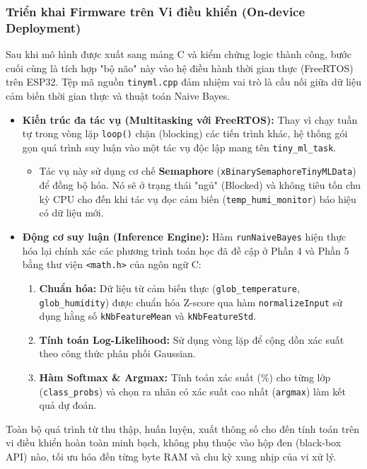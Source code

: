 \subsubsection{Triển khai Firmware trên Vi điều khiển (On-device Deployment)}

Sau khi mô hình được xuất sang mảng C và kiểm chứng logic thành công, bước cuối cùng là tích hợp "bộ não" này vào hệ điều hành thời gian thực (FreeRTOS) trên ESP32. Tệp mã nguồn \texttt{tinyml.cpp} đảm nhiệm vai trò là cầu nối giữa dữ liệu cảm biến thời gian thực và thuật toán Naive Bayes.

\begin{itemize}
    \item \textbf{Kiến trúc đa tác vụ (Multitasking với FreeRTOS):} Thay vì chạy tuần tự trong vòng lặp \texttt{loop()} chặn (blocking) các tiến trình khác, hệ thống gói gọn quá trình suy luận vào một tác vụ độc lập mang tên \texttt{tiny\_ml\_task}.
    \begin{itemize}
        \item Tác vụ này sử dụng cơ chế \textbf{Semaphore} (\texttt{xBinarySemaphoreTinyMLData}) để đồng bộ hóa. Nó sẽ ở trạng thái "ngủ" (Blocked) và không tiêu tốn chu kỳ CPU cho đến khi tác vụ đọc cảm biến (\texttt{temp\_humi\_monitor}) báo hiệu có dữ liệu mới.
    \end{itemize}
    \item \textbf{Động cơ suy luận (Inference Engine):} Hàm \texttt{runNaiveBayes} hiện thực hóa lại chính xác các phương trình toán học đã đề cập ở Phần 4 và Phần 5 bằng thư viện \texttt{<math.h>} của ngôn ngữ C:
    \begin{enumerate}
        \item \textbf{Chuẩn hóa:} Dữ liệu từ cảm biến thực (\texttt{glob\_temperature}, \texttt{glob\_humidity}) được chuẩn hóa Z-score qua hàm \texttt{normalizeInput} sử dụng hằng số \texttt{kNbFeatureMean} và \texttt{kNbFeatureStd}.
        \item \textbf{Tính toán Log-Likelihood:} Sử dụng vòng lặp để cộng dồn xác suất theo công thức phân phối Gaussian.
        \item \textbf{Hàm Softmax \& Argmax:} Tính toán xác suất (\%) cho từng lớp (\texttt{class\_probs}) và chọn ra nhãn có xác suất cao nhất (\texttt{argmax}) làm kết quả dự đoán.
    \end{enumerate}
\end{itemize}


Toàn bộ quá trình từ thu thập, huấn luyện, xuất thông số cho đến tính toán trên vi điều khiển hoàn toàn minh bạch, không phụ thuộc vào hộp đen (black-box API) nào, tối ưu hóa đến từng byte RAM và chu kỳ xung nhịp của vi xử lý.